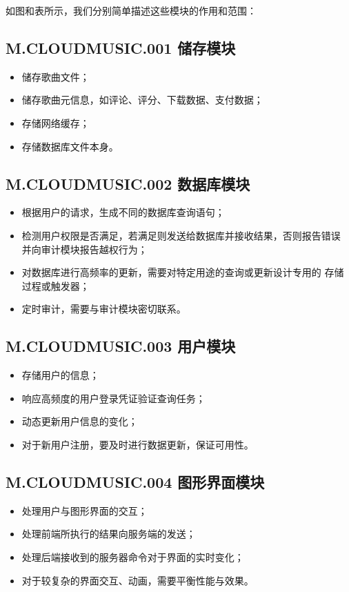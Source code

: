 如图和表所示，我们分别简单描述这些模块的作用和范围：

\subsection{M.CLOUDMUSIC.001 储存模块}
\begin{itemize}
    \item 储存歌曲文件；
    \item 储存歌曲元信息，如评论、评分、下载数据、支付数据；
    \item 存储网络缓存；
    \item 存储数据库文件本身。
\end{itemize}

\subsection{M.CLOUDMUSIC.002 数据库模块}
\begin{itemize}
    \item 根据用户的请求，生成不同的数据库查询语句；
    \item 检测用户权限是否满足，若满足则发送给数据库并接收结果，否则报告错误
        并向审计模块报告越权行为；
    \item 对数据库进行高频率的更新，需要对特定用途的查询或更新设计专用的
        存储过程或触发器；
    \item 定时审计，需要与审计模块密切联系。
\end{itemize}

\subsection{M.CLOUDMUSIC.003 用户模块}
\begin{itemize}
    \item 存储用户的信息；
    \item 响应高频度的用户登录凭证验证查询任务；
    \item 动态更新用户信息的变化；
    \item 对于新用户注册，要及时进行数据更新，保证可用性。
\end{itemize}

\subsection{M.CLOUDMUSIC.004 图形界面模块}
\begin{itemize}
    \item 处理用户与图形界面的交互；
    \item 处理前端所执行的结果向服务端的发送；
    \item 处理后端接收到的服务器命令对于界面的实时变化；
    \item 对于较复杂的界面交互、动画，需要平衡性能与效果。
\end{itemize}

